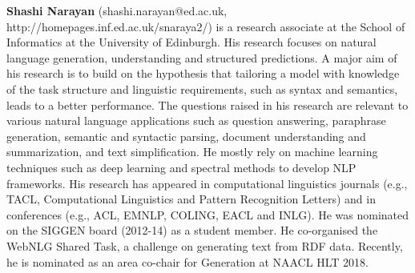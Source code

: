   {\bfseries Shashi Narayan} (shashi.narayan@ed.ac.uk, http://homepages.inf.ed.ac.uk/snaraya2/) is a research associate at the School of Informatics at the University of Edinburgh. His research focuses on natural language generation, understanding and structured predictions. A major aim of his research is to build on the hypothesis that tailoring a model with knowledge of the task structure and linguistic requirements, such as syntax and semantics, leads to a better performance. The questions raised in his research are relevant to various natural language applications such as question answering, paraphrase generation, semantic and syntactic parsing, document understanding and summarization, and text simplification. He mostly rely on machine learning techniques such as deep learning and spectral methods to develop NLP frameworks. His research has appeared in computational linguistics journals (e.g., TACL, Computational Linguistics and Pattern Recognition Letters) and in conferences (e.g., ACL, EMNLP, COLING, EACL and INLG). He was nominated on the SIGGEN board (2012-14) as a student member. He co-organised the WebNLG Shared Task, a challenge on generating text from RDF data. Recently, he is nominated as an area co-chair for Generation at NAACL HLT 2018.
